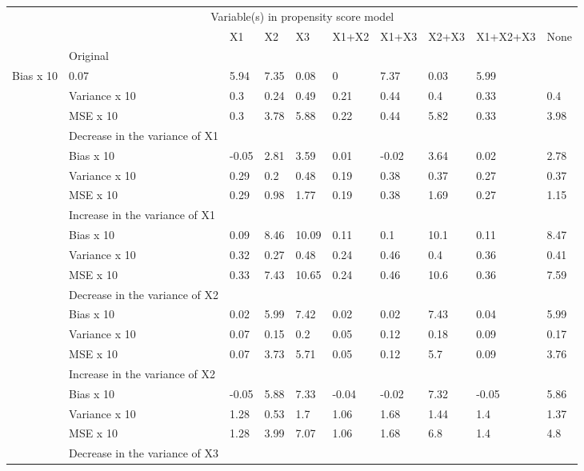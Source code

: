 \documentclass[10,a4paperpaper,]{article}
\begin{document}
\begin{table}[ht]
\centering
\begin{tabular}{rlllllllll}
  \hline
  & \multicolumn{8}{c}{Variable(s) in propensity score model} \\
 & & X1 & X2 & X3 & X1+X2 & X1+X3 & X2+X3 & X1+X2+X3 & None \\
 \hline
 & Original &  &  &  &  &  &  &  &  \\ 
   Bias x 10 & 0.07 & 5.94 & 7.35 & 0.08 & 0 & 7.37 & 0.03 & 5.99 \\ 
   & Variance x 10 & 0.3 & 0.24 & 0.49 & 0.21 & 0.44 & 0.4 & 0.33 & 0.4 \\ 
   & MSE x 10 & 0.3 & 3.78 & 5.88 & 0.22 & 0.44 & 5.82 & 0.33 & 3.98 \\ 
   & Decrease in the variance of X1 &  &  &  &  &  &  &  &  \\ 
   & Bias x 10 & -0.05 & 2.81 & 3.59 & 0.01 & -0.02 & 3.64 & 0.02 & 2.78 \\ 
   & Variance x 10 & 0.29 & 0.2 & 0.48 & 0.19 & 0.38 & 0.37 & 0.27 & 0.37 \\ 
   & MSE x 10 & 0.29 & 0.98 & 1.77 & 0.19 & 0.38 & 1.69 & 0.27 & 1.15 \\ 
   & Increase in the variance of X1 &  &  &  &  &  &  &  &  \\ 
   & Bias x 10 & 0.09 & 8.46 & 10.09 & 0.11 & 0.1 & 10.1 & 0.11 & 8.47 \\ 
   & Variance x 10 & 0.32 & 0.27 & 0.48 & 0.24 & 0.46 & 0.4 & 0.36 & 0.41 \\ 
   & MSE x 10 & 0.33 & 7.43 & 10.65 & 0.24 & 0.46 & 10.6 & 0.36 & 7.59 \\ 
   & Decrease in the variance of X2 &  &  &  &  &  &  &  &  \\ 
   & Bias x 10 & 0.02 & 5.99 & 7.42 & 0.02 & 0.02 & 7.43 & 0.04 & 5.99 \\ 
   & Variance x 10 & 0.07 & 0.15 & 0.2 & 0.05 & 0.12 & 0.18 & 0.09 & 0.17 \\ 
   & MSE x 10 & 0.07 & 3.73 & 5.71 & 0.05 & 0.12 & 5.7 & 0.09 & 3.76 \\ 
   & Increase in the variance of X2 &  &  &  &  &  &  &  &  \\ 
   & Bias x 10 & -0.05 & 5.88 & 7.33 & -0.04 & -0.02 & 7.32 & -0.05 & 5.86 \\ 
   & Variance x 10 & 1.28 & 0.53 & 1.7 & 1.06 & 1.68 & 1.44 & 1.4 & 1.37 \\ 
   & MSE x 10 & 1.28 & 3.99 & 7.07 & 1.06 & 1.68 & 6.8 & 1.4 & 4.8 \\ 
   & Decrease in the variance of X3 &  &  &  &  &  &  &  &  \\ 

\end{tabular}
\end{table}
\end{document}
